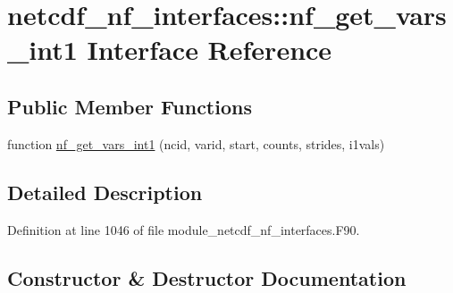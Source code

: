 \hypertarget{interfacenetcdf__nf__interfaces_1_1nf__get__vars__int1}{}\section{netcdf\+\_\+nf\+\_\+interfaces\+:\+:nf\+\_\+get\+\_\+vars\+\_\+int1 Interface Reference}
\label{interfacenetcdf__nf__interfaces_1_1nf__get__vars__int1}
\subsection*{Public Member Functions}
\begin{DoxyCompactItemize}
\item 
function \hyperlink{interfacenetcdf__nf__interfaces_1_1nf__get__vars__int1_ae2dfc966fb6c0c207ae4417e58b87868}{nf\+\_\+get\+\_\+vars\+\_\+int1} (ncid, varid, start, counts, strides, i1vals)
\end{DoxyCompactItemize}


\subsection{Detailed Description}


Definition at line 1046 of file module\+\_\+netcdf\+\_\+nf\+\_\+interfaces.\+F90.



\subsection{Constructor \& Destructor Documentation}
\mbox{\label{interfacenetcdf__nf__interfaces_1_1nf__get__vars__int1_ae2dfc966fb6c0c207ae4417e58b87868}} 
